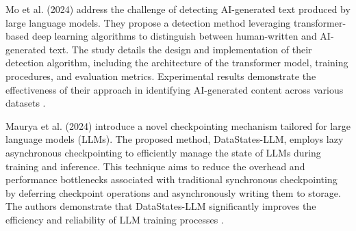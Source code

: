 \documentclass{josis}
\begin{document}
Mo et al. (2024) address the challenge of detecting AI-generated text produced by large language models. They propose a detection method leveraging transformer-based deep learning algorithms to distinguish between human-written and AI-generated text. The study details the design and implementation of their detection algorithm, including the architecture of the transformer model, training procedures, and evaluation metrics. Experimental results demonstrate the effectiveness of their approach in identifying AI-generated content across various datasets \cite{Mo2024}.

Maurya et al. (2024) introduce a novel checkpointing mechanism tailored for large language models (LLMs). The proposed method, DataStates-LLM, employs lazy asynchronous checkpointing to efficiently manage the state of LLMs during training and inference. This technique aims to reduce the overhead and performance bottlenecks associated with traditional synchronous checkpointing by deferring checkpoint operations and asynchronously writing them to storage. The authors demonstrate that DataStates-LLM significantly improves the efficiency and reliability of LLM training processes \cite{Maurya2024}.
\end{document}
